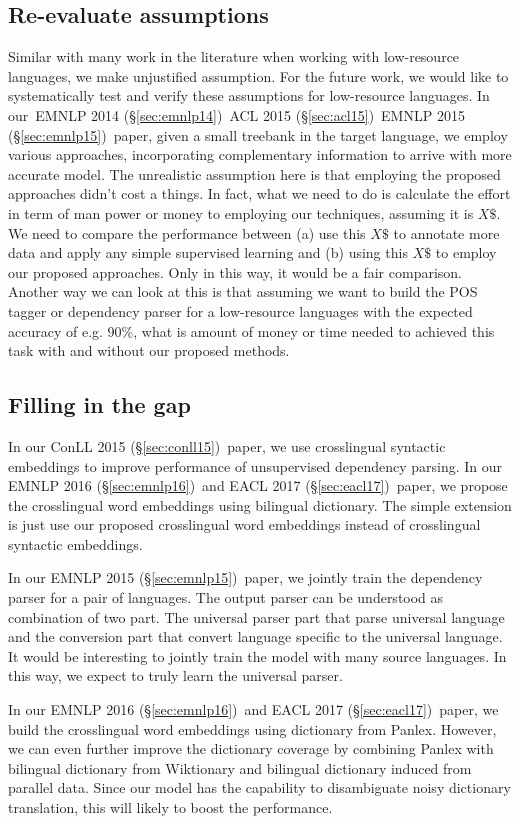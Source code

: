 \documentclass[12pt,twoside,final,hidelinks]{ltthesis}
\theoremstyle{definition}
\newcommand\emnlpiv{EMNLP 2014 (\S\ref{sec:emnlp14})}
\newcommand\conllv{ConLL 2015 (\S\ref{sec:conll15})}
\newcommand\aclv{ACL 2015 (\S\ref{sec:acl15})}
\newcommand\emnlpv{EMNLP 2015 (\S\ref{sec:emnlp15})}
\newcommand\emnlpvi{EMNLP 2016 (\S\ref{sec:emnlp16})}
\newcommand\eaclvii{EACL 2017 (\S\ref{sec:eacl17})}
\begin{document}
\subsection{Re-evaluate assumptions}
Similar with many work in the literature when working with low-resource languages, we make unjustified assumption. 
For the future work, we would like to systematically test and verify these assumptions for low-resource languages.
In our~\emnlpiv\, \aclv\, \emnlpv\ paper, given a small treebank in the target language, we employ various approaches, incorporating 
complementary information to arrive with more accurate model. The unrealistic assumption here is that employing the proposed approaches 
didn't cost a things. In fact, what we need to do is calculate the effort in term of man power or money to employing our techniques, 
assuming it is $X\$$. We need to compare the performance between (a) use this $X\$$ to annotate more data and apply any simple supervised 
learning and (b) using this $X\$$ to employ our proposed approaches. Only in this way, it would be a fair comparison. Another way we can look 
at this is that assuming we want to build the POS tagger or dependency parser for a low-resource languages with the expected accuracy of e.g. 90\%, 
what is amount of money or time needed to achieved this task with and without our proposed methods. 

\subsection{Filling in  the gap}
In our \conllv\ paper, we use crosslingual syntactic embeddings to improve performance of unsupervised dependency parsing. In our \emnlpvi\ and \eaclvii\ paper, 
we propose the crosslingual word embeddings using bilingual dictionary. The simple extension is just use our proposed crosslingual word embeddings instead of 
crosslingual syntactic embeddings. 

In our \emnlpv\ paper, we jointly train the dependency parser for a pair of languages. The output parser can be understood as combination of two part. The universal
parser part that parse universal language and the conversion part that convert language specific to the universal language. It would be interesting to jointly train the model with many source languages. In this way, we expect to truly learn the universal parser. 

In our \emnlpvi\ and \eaclvii\ paper, we build the crosslingual word embeddings using dictionary from Panlex. However, we can even further improve 
the dictionary coverage by combining Panlex with bilingual dictionary from Wiktionary and bilingual dictionary induced from parallel data. Since our model 
has the capability to disambiguate noisy dictionary translation, this will likely to boost the performance. 
\end{document}
